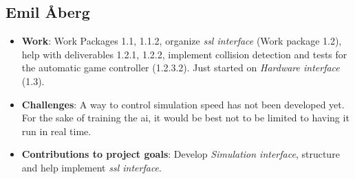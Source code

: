 \subsection*{Emil Åberg}
\begin{itemize}
    \item \textbf{Work}: Work Packages 1.1, 1.1.2, organize \textit{\acs{ssl} interface} (Work package 1.2), help with deliverables 1.2.1, 1.2.2, implement collision detection and tests for the automatic game controller (1.2.3.2). Just started on \textit{Hardware interface} (1.3).
    \item \textbf{Challenges}: A way to control simulation speed has not been developed yet. For the sake of training the \ac{ai}, it would be best not to be limited to having it run in real time.
    \item \textbf{Contributions to project goals}: Develop \textit{Simulation interface}, structure and help implement \textit{\acs{ssl} interface}.
\end{itemize}



